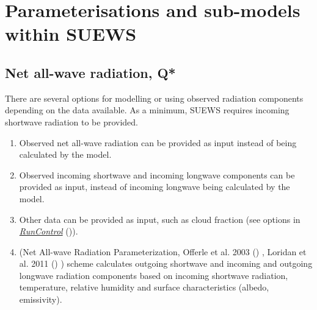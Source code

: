 \documentclass[letterpaper,10pt,english]{sphinxmanual}
\begin{document}
\chapter{Parameterisations and sub-models within SUEWS}
\label{\detokenize{parameterisations-and-sub-models::doc}}\label{\detokenize{parameterisations-and-sub-models:benchmark-system}}\label{\detokenize{parameterisations-and-sub-models:parameterisations-and-sub-models-within-suews}}

\section{Net all-wave radiation, Q*}
\label{\detokenize{parameterisations-and-sub-models:net-all-wave-radiation-q}}
There are several options for modelling or using observed radiation
components depending on the data available. As a minimum, SUEWS requires
incoming shortwave radiation to be provided.
\begin{enumerate}
\item {} 
Observed net all-wave radiation can be provided as input instead of
being calculated by the model.

\item {} 
Observed incoming shortwave and incoming longwave components can be
provided as input, instead of incoming longwave being calculated by
the model.

\item {} 
Other data can be provided as input, such as cloud fraction (see
options in {\hyperref[\detokenize{parameterisations-and-sub-models:RunControl.nml}]{\emph{RunControl}}} ()).

\item {} 
 (Net All-wave Radiation Parameterization, Offerle et al.
2003 \label{\detokenize{parameterisations-and-sub-models:id1}}{\hyperref[\detokenize{references:o2003}]{\sphinxcrossref{{[}O2003{]}}}} () , Loridan et al. 2011 \label{\detokenize{parameterisations-and-sub-models:id2}}{\hyperref[\detokenize{references:l2011}]{\sphinxcrossref{{[}L2011{]}}}} () ) scheme calculates outgoing
shortwave and incoming and outgoing longwave radiation components
based on incoming shortwave radiation, temperature, relative humidity
and surface characteristics (albedo, emissivity).

\end{enumerate}
\end{document}
